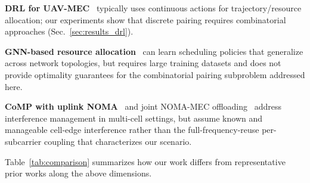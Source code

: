 \documentclass[journal]{IEEEtran}
\begin{document}
\textbf{DRL for UAV-MEC}~\cite{zhou2024multiuav,sun2024drl,zhang2025star,zakaryia2025task,liu2025dual} typically uses continuous actions for trajectory/resource allocation; our experiments show that discrete pairing requires combinatorial approaches (Sec.~\ref{sec:results_drl}).

\textbf{GNN-based resource allocation}~\cite{cui2023gnn} can learn scheduling policies that generalize across network topologies, but requires large training datasets and does not provide optimality guarantees for the combinatorial pairing subproblem addressed here.

\textbf{CoMP with uplink NOMA}~\cite{sun2022multi} and joint NOMA-MEC offloading~\cite{zhu2022multi} address interference management in multi-cell settings, but assume known and manageable cell-edge interference rather than the full-frequency-reuse per-subcarrier coupling that characterizes our scenario.

Table~\ref{tab:comparison} summarizes how our work differs from representative prior works along the above dimensions.
\end{document}

